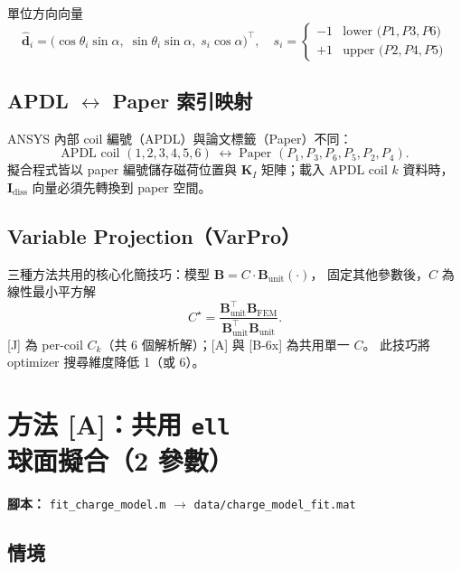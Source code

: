 \documentclass[11pt,a4paper]{article}
\newcommand{\KI}{\mathbf{K}_I}
\newcommand{\Idiss}{\mathbf{I}_{\mathrm{diss}}}
\newcommand{\bvec}{\mathbf{B}}
\newcommand{\dhat}{\hat{\mathbf{d}}}
\begin{document}
單位方向向量
\begin{equation}
\dhat_i = \big(\cos\theta_i \sin\alpha,\; \sin\theta_i \sin\alpha,\; s_i \cos\alpha\big)^\top,\quad
s_i = \begin{cases} -1 & \text{lower (}P1, P3, P6\text{)} \\ +1 & \text{upper (}P2, P4, P5\text{)} \end{cases}
\end{equation}

\subsection{APDL \(\leftrightarrow\) Paper 索引映射}

ANSYS 內部 coil 編號（APDL）與論文標籤（Paper）不同：
\begin{equation}
\text{APDL coil } (1,2,3,4,5,6) \;\longleftrightarrow\;
\text{Paper } (P_1, P_3, P_6, P_5, P_2, P_4).
\end{equation}
擬合程式皆以 paper 編號儲存磁荷位置與 \(\KI\) 矩陣；載入 APDL coil \(k\) 資料時，
\(\Idiss\) 向量必須先轉換到 paper 空間。

\subsection{Variable Projection（VarPro）}\label{sec:varpro}

三種方法共用的核心化簡技巧：模型 \(\bvec = C \cdot \bvec_{\text{unit}}(\cdot)\)，
固定其他參數後，\(C\) 為線性最小平方解
\begin{equation}
C^\star = \frac{\bvec_{\text{unit}}^\top \bvec_{\text{FEM}}}{\bvec_{\text{unit}}^\top \bvec_{\text{unit}}}.
\end{equation}
[J] 為 per-coil \(C_k\)（共 6 個解析解）；[A] 與 [B-6x] 為共用單一 \(C\)。
此技巧將 optimizer 搜尋維度降低 1（或 6）。

\section{方法 [A]：共用 \texttt{ell} 球面擬合（2 參數）}

\textbf{腳本：} \texttt{fit\_charge\_model.m} \(\rightarrow\) \texttt{data/charge\_model\_fit.mat}

\subsection{情境}
\end{document}
